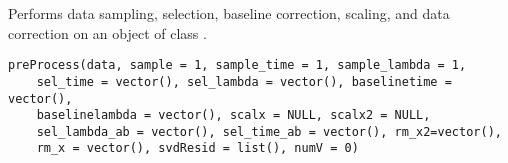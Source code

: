 \documentclass{article}
\begin{document}
\begin{Description}\relax
Performs data sampling, selection, baseline correction,  
scaling, and data correction on an object of class .
\end{Description}
\begin{Usage}
\begin{verbatim}
preProcess(data, sample = 1, sample_time = 1, sample_lambda = 1, 
    sel_time = vector(), sel_lambda = vector(), baselinetime = vector(), 
    baselinelambda = vector(), scalx = NULL, scalx2 = NULL, 
    sel_lambda_ab = vector(), sel_time_ab = vector(), rm_x2=vector(), 
    rm_x = vector(), svdResid = list(), numV = 0)
\end{verbatim}
\end{Usage}
\end{document}
